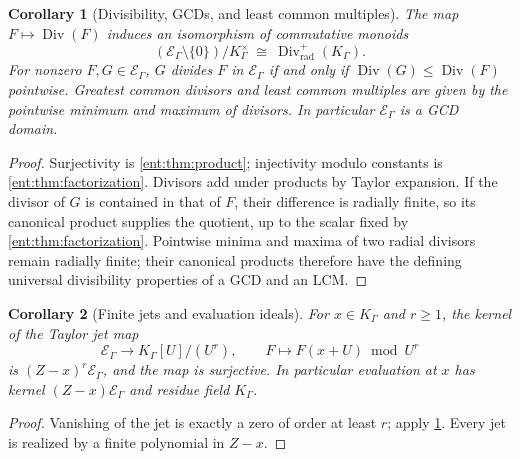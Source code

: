 \documentclass[11pt]{article}
\theoremstyle{plain}
\theoremstyle{plain}
\theoremstyle{plain}
\newtheorem{corollary}[corollary]{Corollary}
\theoremstyle{definition}
\theoremstyle{definition}
\theoremstyle{definition}
\theoremstyle{definition}
\theoremstyle{remark}
\newcommand{\K}{K_\Gamma}\newcommand{\KD}{K_\Delta}
\newcommand{\E}{\mathcal E_\Gamma}
\DeclareMathOperator{\Div}{Div}\DeclareMathOperator{\inpol}{in}
\begin{document}
\begin{corollary}[Divisibility, GCDs, and least common multiples]
\label{ent:cor:gcd}
The map $F\mapsto\Div(F)$ induces an isomorphism of commutative monoids
\[
 (\E\setminus\{0\})/\K^\times
 \ \cong\ \Div^+_{\mathrm{rad}}(\K).
\]
For nonzero $F,G\in\E$, $G$ divides $F$ in $\E$ if and only if
$\Div(G)\le\Div(F)$ pointwise. Greatest common divisors and least common
multiples are given by the pointwise minimum and maximum of divisors. In
particular $\E$ is a GCD domain.
\end{corollary}
\begin{proof}
Surjectivity is \cref{ent:thm:product}; injectivity modulo constants is
\cref{ent:thm:factorization}. Divisors add under products by Taylor
expansion. If the divisor of $G$ is contained in that of $F$, their
difference is radially finite, so its canonical product supplies the
quotient, up to the scalar fixed by \cref{ent:thm:factorization}. Pointwise
minima and maxima of two radial divisors remain radially finite; their
canonical products therefore have the defining universal divisibility
properties of a GCD and an LCM.
\end{proof}

\begin{corollary}[Finite jets and evaluation ideals]\label{ent:cor:evaluation}
For $x\in\K$ and $r\ge1$, the kernel of the Taylor jet map
\[
 \E\longrightarrow\K[U]/(U^r),\qquad
 F\longmapsto F(x+U)\bmod U^r
\]
is $(Z-x)^r\E$, and the map is surjective. In particular evaluation at $x$
has kernel $(Z-x)\E$ and residue field $\K$.
\end{corollary}
\begin{proof}
Vanishing of the jet is exactly a zero of order at least $r$; apply
\cref{ent:cor:gcd}. Every jet is realized by a finite polynomial in $Z-x$.
\end{proof}
\end{document}
